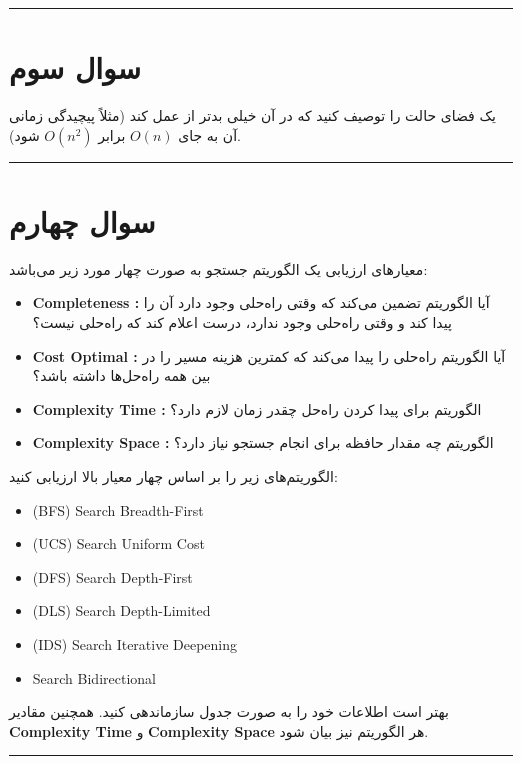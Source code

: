 \documentclass[a4paper,10pt]{article}
\begin{document}
\hline
\rule{\linewidth}{0.4pt}

\section{سوال سوم}
یک فضای حالت را توصیف کنید که در آن 
خیلی بدتر از 
عمل کند 
(مثلاً پیچیدگی زمانی آن به جای 
$O(n)$ 
برابر 
$O(n^2)$ 
شود).
\bigskip
\bigskip
\hline
\rule{\linewidth}{0.4pt}

\section{سوال چهارم}
معیارهای ارزیابی یک الگوریتم جستجو به صورت چهار مورد زیر می‌باشد:
\begin{itemize}
    \item \textbf{ Completeness :} آیا الگوریتم تضمین می‌کند که وقتی راه‌حلی وجود دارد آن را پیدا کند و وقتی راه‌حلی وجود ندارد، درست اعلام کند که راه‌حلی نیست؟
    \item \textbf{ Cost Optimal :} آیا الگوریتم راه‌حلی را پیدا می‌کند که کمترین هزینه مسیر را در بین همه راه‌حل‌ها داشته باشد؟
    \item \textbf{ Complexity Time :} الگوریتم برای پیدا کردن راه‌حل چقدر زمان لازم دارد؟
    \item \textbf{ Complexity Space :} الگوریتم چه مقدار حافظه برای انجام جستجو نیاز دارد؟
\end{itemize}
الگوریتم‌های زیر را بر اساس چهار معیار بالا ارزیابی کنید:
\begin{itemize}
    \item (BFS) Search Breadth-First
    \item (UCS) Search Uniform Cost
    \item (DFS) Search Depth-First
    \item (DLS) Search Depth-Limited 
    \item (IDS) Search Iterative Deepening
    \item Search Bidirectional 
\end{itemize}
بهتر است اطلاعات خود را به صورت جدول سازماندهی کنید. همچنین مقادیر \textbf{ Complexity Time } و \textbf{ Complexity Space} هر الگوریتم نیز بیان شود.
\bigskip
\bigskip
\hline
\rule{\linewidth}{0.4pt}


\end{document}
